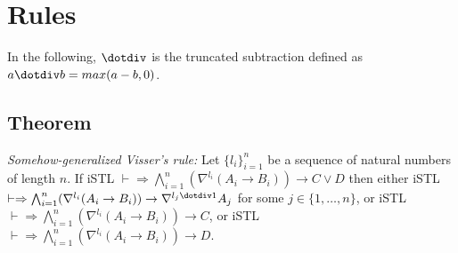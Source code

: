 \section{Rules} In the following, $\dotdiv$ is the truncated subtraction defined as $a \dotdiv b = max(a-b, 0)$.

\subsection{Theorem} \textit{Somehow-generalized Visser's rule:} Let $\{ l_i \}_{i=1}^n$ be a sequence of natural numbers of length $n$. If {\small iSTL} $\vdash \Rightarrow \bigwedge_{i=1}^n (\nabla^{l_i} (A_i \rightarrow B_i)) \rightarrow C \lor D$ then either {\small iSTL} $\vdash \Rightarrow \bigwedge_{i=1}^n (\nabla^{l_i} (A_i \rightarrow B_i)) \rightarrow \nabla^{l_j \dotdiv 1} A_j$ for some $j \in \{ 1 , \dots , n \}$, or {\small iSTL} $\vdash \Rightarrow \bigwedge_{i=1}^n (\nabla^{l_i} (A_i \rightarrow B_i)) \rightarrow C$, or {\small iSTL} $\vdash \Rightarrow \bigwedge_{i=1}^n (\nabla^{l_i} (A_i \rightarrow B_i)) \rightarrow D$.

